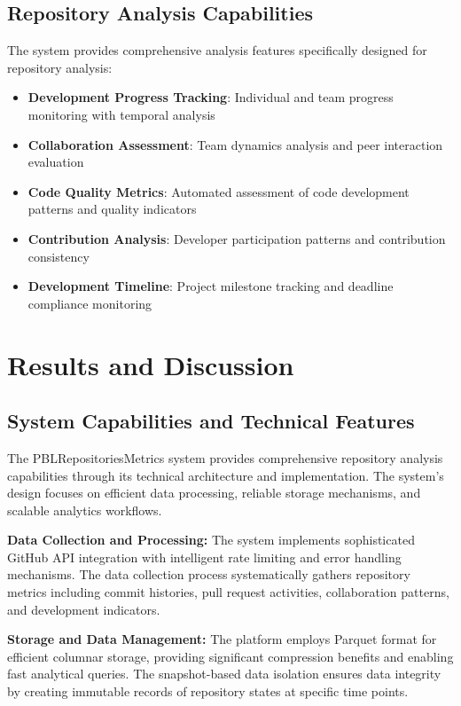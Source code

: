 \documentclass[12pt,a4paper]{article}
\begin{document}
\subsection{Repository Analysis Capabilities}

The system provides comprehensive analysis features specifically designed for repository analysis:


\begin{itemize}
\item \textbf{Development Progress Tracking}: Individual and team progress monitoring with temporal analysis
\item \textbf{Collaboration Assessment}: Team dynamics analysis and peer interaction evaluation
\item \textbf{Code Quality Metrics}: Automated assessment of code development patterns and quality indicators
\item \textbf{Contribution Analysis}: Developer participation patterns and contribution consistency
\item \textbf{Development Timeline}: Project milestone tracking and deadline compliance monitoring
\end{itemize}


\section{Results and Discussion}

\subsection{System Capabilities and Technical Features}

The PBLRepositoriesMetrics system provides comprehensive repository analysis capabilities through its technical architecture and implementation. The system's design focuses on efficient data processing, reliable storage mechanisms, and scalable analytics workflows.

\textbf{Data Collection and Processing:} The system implements sophisticated GitHub API integration with intelligent rate limiting and error handling mechanisms. The data collection process systematically gathers repository metrics including commit histories, pull request activities, collaboration patterns, and development indicators.

\textbf{Storage and Data Management:} The platform employs Parquet format for efficient columnar storage, providing significant compression benefits and enabling fast analytical queries. The snapshot-based data isolation ensures data integrity by creating immutable records of repository states at specific time points.
\end{document}
